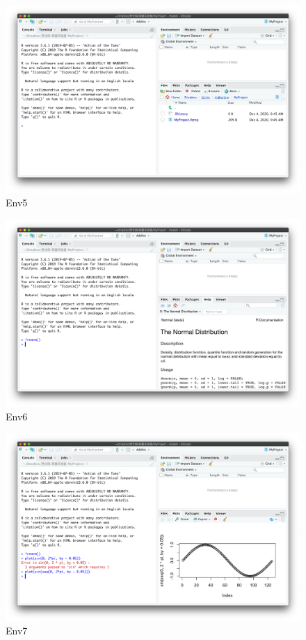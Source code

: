 \documentclass[]{scrbook}
\begin{document}
\begin{figure}
\centering
\includegraphics{Fig/ch1/Env5.png}
\caption{Env5}
\end{figure}

\begin{figure}
\centering
\includegraphics{Fig/ch1/Env6.png}
\caption{Env6}
\end{figure}

\begin{figure}
\centering
\includegraphics{Fig/ch1/Env7.png}
\caption{Env7}
\end{figure}
\end{document}
